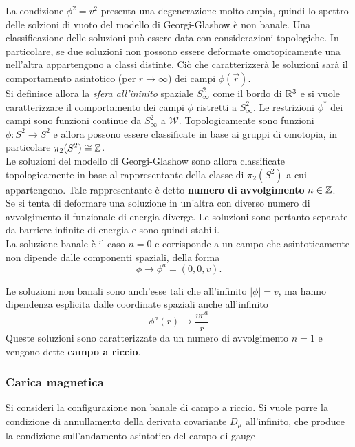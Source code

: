 La condizione $\phi^2 = v^2$ presenta una degenerazione molto ampia, quindi
lo spettro delle solzioni di vuoto del modello di Georgi-Glashow è non banale.
Una classificazione delle soluzioni può essere data con considerazioni topologiche.
In particolare, se due soluzioni non possono essere deformate omotopicamente una
nell'altra appartengono a classi distinte. Ciò che caratterizzerà le soluzioni
sarà il comportamento asintotico (per $r \to \infty$) dei campi $\phi(\vec r)$.\\

Si definisce allora la \emph{sfera all'ininito} spaziale $S^2_\infty$ come il bordo di
$\mathbb{R}^3$ e si vuole caratterizzare il comportamento dei campi $\phi$ ristretti a
$S^2_\infty$. Le restrizioni $\phi^*$ dei campi sono funzioni continue da $S^2_\infty$
a $\mathcal{W}$.
Topologicamente sono funzioni $\phi : S^2 \to S^2$ e allora possono essere
classificate in base ai gruppi di omotopia, in particolare $\pi_2(S^2) \cong \mathbb{Z}$.\\

Le soluzioni del modello di Georgi-Glashow sono allora classificate topologicamente
in base al rappresentante della classe di $\pi_2(S^2)$ a cui appartengono.
Tale rappresentante è detto \textbf{numero di avvolgimento} $n \in \mathbb{Z}$.\\

Se si tenta di deformare una soluzione in un'altra con diverso numero di avvolgimento
il funzionale di energia diverge. Le soluzioni sono pertanto separate da barriere
infinite di energia e sono quindi stabili.\\

La soluzione banale è il caso $n = 0$ e corrisponde a un campo che asintoticamente
non dipende dalle componenti spaziali, della forma
 $$\phi \to \phi^a = (0,0,v).$$

Le soluzioni non banali sono anch'esse tali che all'infinito $|\phi| = v$,
ma hanno dipendenza esplicita dalle coordinate spaziali anche all'infinito
\begin{equation}\label{eq:nonabelianw1phi}
   \phi^a(r) \to \frac{vr^a}{r}
\end{equation}
Queste soluzioni sono caratterizzate da un numero di avvolgimento $n=1$ e vengono
dette \textbf{campo a riccio}.

\subsubsection{Carica magnetica}
Si consideri la configurazione non banale di campo a riccio. Si vuole porre la
condizione di annullamento della derivata covariante $D _\mu$ all'infinito, che
produce la condizione sull'andamento asintotico del campo di gauge

